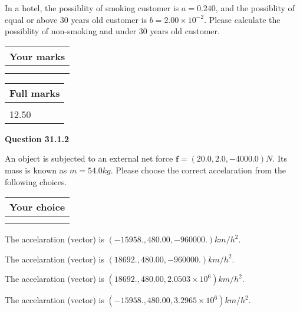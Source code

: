 \documentclass[12pt]{article}
\begin{document}
  
In a hotel, the possiblity of  %
smoking customer is
$a =  %
0.240$, and the possiblity of  %
equal or above 30 years old customer is $ b =  %
2.00 \times 10^{-2}$.
Please calculate the possiblity of  %
 non-smoking and  %
under 30 years old customer.
 

 

 
\vspace{0.3in}
  
\vspace{0.2in}
  
         \begin{tabular}{|l|}
\hline
 Your marks  \\
\hline
 \\ 
 \\ 
\hline
\end{tabular}
\hspace{0.05in} \begin{tabular}{|l|}
\hline
 Full marks  \\
\hline
 \\ 
12.50 \\
\hline
\end{tabular}
{\textbf{\Large{Question
31.1.2 
}}}
  
  
 
An object is subjected to an external net force $\mathbf{f}=(
20.0 ,
2.0,
-4000.0  )N$. Its mass is known as
$m= %
54.0  kg$. Please choose the correct accelaration
from the following choices.
 
  
  
\noindent\hspace{3.0in} \begin{tabular}{|l|}
\hline
Your choice \\
\hline
 \\ 
 \\ 
\hline
\end{tabular}
  
  
 
 
The accelaration (vector) is
$(
-15958.,
480.00 ,
-960000.
)km/h^2.
$
 
 
The accelaration (vector) is
$(
18692.,
480.00 ,
-960000.
)km/h^2.
$
 
 
The accelaration (vector) is
$(
18692.,
480.00 ,
2.0503 \times 10^{6}
)km/h^2.
$
 
 
The accelaration (vector) is
$(
-15958.,
480.00 ,
3.2965 \times 10^{6}
)km/h^2.
$
 
\end{document}
